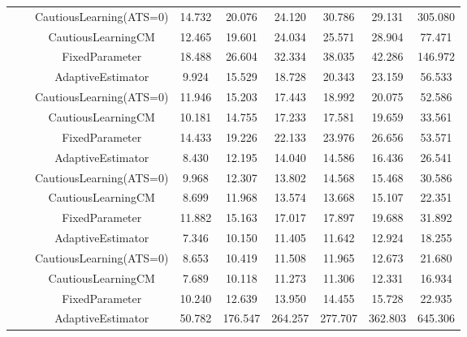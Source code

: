\begin{table}[!h]
\begin{tabular}[t]{ccccccccc}
 &  & CautiousLearning(ATS=0) & 14.732 & 20.076 & 24.120 & 30.786 & 29.131 & 305.080\\

 &  & CautiousLearningCM & 12.465 & 19.601 & 24.034 & 25.571 & 28.904 & 77.471\\

 & \multirow[t]{-4}{*}{\centering\arraybackslash 0.75} & FixedParameter & 18.488 & 26.604 & 32.334 & 38.035 & 42.286 & 146.972\\
\cmidrule{2-9}
 &  & AdaptiveEstimator & 9.924 & 15.529 & 18.728 & 20.343 & 23.159 & 56.533\\

 &  & CautiousLearning(ATS=0) & 11.946 & 15.203 & 17.443 & 18.992 & 20.075 & 52.586\\

 &  & CautiousLearningCM & 10.181 & 14.755 & 17.233 & 17.581 & 19.659 & 33.561\\

 & \multirow[t]{-4}{*}{\centering\arraybackslash 1.00} & FixedParameter & 14.433 & 19.226 & 22.133 & 23.976 & 26.656 & 53.571\\
\cmidrule{2-9}
 &  & AdaptiveEstimator & 8.430 & 12.195 & 14.040 & 14.586 & 16.436 & 26.541\\

 &  & CautiousLearning(ATS=0) & 9.968 & 12.307 & 13.802 & 14.568 & 15.468 & 30.586\\

 &  & CautiousLearningCM & 8.699 & 11.968 & 13.574 & 13.668 & 15.107 & 22.351\\

 & \multirow[t]{-4}{*}{\centering\arraybackslash 1.25} & FixedParameter & 11.882 & 15.163 & 17.017 & 17.897 & 19.688 & 31.892\\
\cmidrule{2-9}
 &  & AdaptiveEstimator & 7.346 & 10.150 & 11.405 & 11.642 & 12.924 & 18.255\\

 &  & CautiousLearning(ATS=0) & 8.653 & 10.419 & 11.508 & 11.965 & 12.673 & 21.680\\

 &  & CautiousLearningCM & 7.689 & 10.118 & 11.273 & 11.306 & 12.331 & 16.934\\

\multirow[t]{-28}{*}{\centering\arraybackslash 1} & \multirow[t]{-4}{*}{\centering\arraybackslash 1.50} & FixedParameter & 10.240 & 12.639 & 13.950 & 14.455 & 15.728 & 22.935\\
\cmidrule{1-9}
 &  & AdaptiveEstimator & 50.782 & 176.547 & 264.257 & 277.707 & 362.803 & 645.306\\


\end{tabular}
\end{table}
